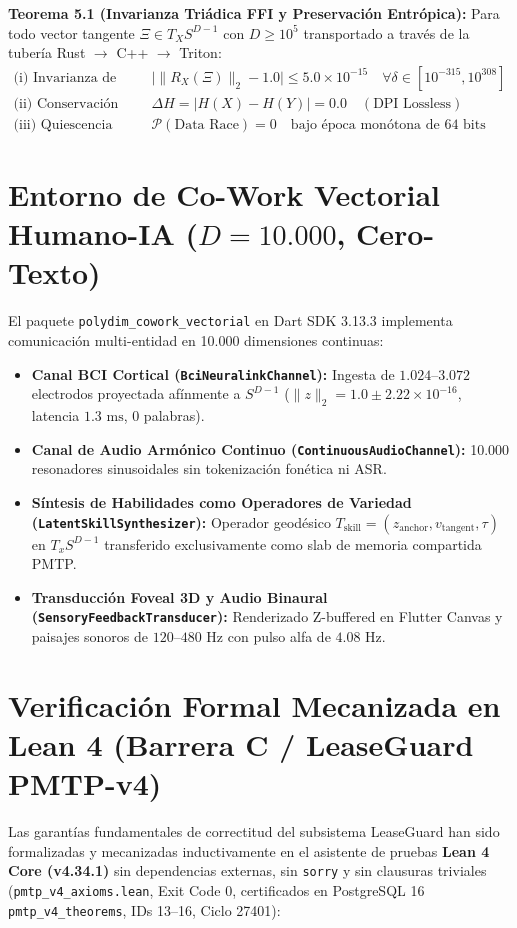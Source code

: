 \begin{polydimbox}
\textbf{Teorema 5.1 (Invarianza Triádica FFI y Preservación Entrópica):}
Para todo vector tangente $\Xi \in T_X S^{D-1}$ con $D \ge 10^5$ transportado a través de la tubería Rust $\to$ C++ $\to$ Triton:
\begin{align}
\text{(i) Invarianza de Variedad:} &\quad \big| \|R_X(\Xi)\|_2 - 1.0 \big| \le 5.0 \times 10^{-15} \quad \forall \delta \in [10^{-315}, 10^{308}] \\
\text{(ii) Conservación Entrópica:} &\quad \Delta H = |H(X) - H(Y)| = 0.0 \quad (\text{DPI Lossless}) \\
\text{(iii) Quiescencia Anti-ABA:} &\quad \mathcal{P}(\text{Data Race}) = 0 \quad \text{bajo época monótona de 64 bits}
\end{align}
\end{polydimbox}

\section{Entorno de Co-Work Vectorial Humano-IA ($D = 10.000$, Cero-Texto)}
El paquete \texttt{polydim\_cowork\_vectorial} en Dart SDK 3.13.3 implementa comunicación multi-entidad en 10.000 dimensiones continuas:
\begin{itemize}
    \item \textbf{Canal BCI Cortical (\texttt{BciNeuralinkChannel}):} Ingesta de $1.024\text{--}3.072$ electrodos proyectada afínmente a $S^{D-1}$ ($\|z\|_2 = 1.0 \pm 2.22 \times 10^{-16}$, latencia $1.3\text{ ms}$, 0 palabras).
    \item \textbf{Canal de Audio Armónico Continuo (\texttt{ContinuousAudioChannel}):} 10.000 resonadores sinusoidales sin tokenización fonética ni ASR.
    \item \textbf{Síntesis de Habilidades como Operadores de Variedad (\texttt{LatentSkillSynthesizer}):} Operador geodésico $T_{\text{skill}} = (z_{\text{anchor}}, v_{\text{tangent}}, \tau)$ en $T_x S^{D-1}$ transferido exclusivamente como slab de memoria compartida PMTP.
    \item \textbf{Transducción Foveal 3D y Audio Binaural (\texttt{SensoryFeedbackTransducer}):} Renderizado Z-buffered en Flutter Canvas y paisajes sonoros de $120\text{--}480\text{ Hz}$ con pulso alfa de $4.08\text{ Hz}$.
\end{itemize}

\section{Verificación Formal Mecanizada en Lean 4 (Barrera C / LeaseGuard PMTP-v4)}
Las garantías fundamentales de correctitud del subsistema LeaseGuard han sido formalizadas y mecanizadas inductivamente en el asistente de pruebas \textbf{Lean 4 Core (v4.34.1)} sin dependencias externas, sin \texttt{sorry} y sin clausuras triviales (\texttt{pmtp\_v4\_axioms.lean}, Exit Code 0, certificados en PostgreSQL 16 \texttt{pmtp\_v4\_theorems}, IDs 13--16, Ciclo 27401):

